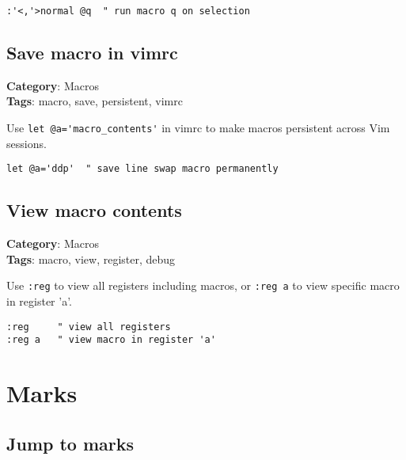 {{{{{{\begin{Exa*}{}
\begin{Verbatim}[fontsize=\footnotesize, breaklines, breakanywhere]
:'<,'>normal @q  " run macro q on selection
\end{Verbatim}
\end{Exa*}

\section{Save macro in vimrc}

\textbf{Category}: Macros\\ \textbf{Tags}: macro, save, persistent, vimrc
\vspace{0.5cm}

Use {\footnotesize \Verb§let @a='macro_contents'§} in vimrc to make macros persistent across Vim sessions.

\begin{Exa*}{}
\begin{Verbatim}[fontsize=\footnotesize, breaklines, breakanywhere]
let @a='ddp'  " save line swap macro permanently
\end{Verbatim}
\end{Exa*}

\section{View macro contents}

\textbf{Category}: Macros\\ \textbf{Tags}: macro, view, register, debug
\vspace{0.5cm}

Use {\footnotesize \Verb§:reg§} to view all registers including macros, or {\footnotesize \Verb§:reg a§} to view specific macro in register 'a'.

\begin{Exa*}{}
\begin{Verbatim}[fontsize=\footnotesize, breaklines, breakanywhere]
:reg     " view all registers
:reg a   " view macro in register 'a'
\end{Verbatim}
\end{Exa*}

\chapter{Marks}
\section{Jump to marks}

}}}}}}
